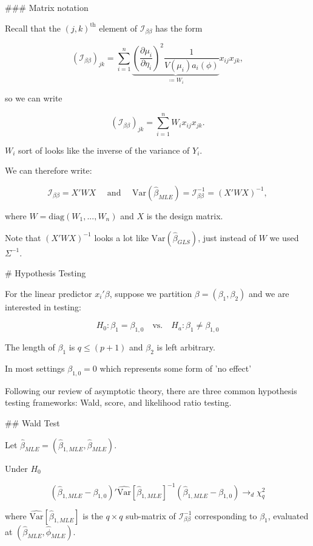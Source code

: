 \documentclass[
  letterpaper,
  DIV=11,
  numbers=noendperiod]{scrreport}
\begin{document}
{### Matrix notation 

Recall that the $(j,k)^{\text{th}}$ element of $\mathcal I_{\beta \beta}$ has the form 

$$(\mathcal I_{\beta \beta})_{jk} = \sum_{i=1}^n \underbrace{\left( \frac{\partial \mu_i}{\partial \eta_i} \right)^2 \frac{1}{V(\mu_i) a_i(\phi)}}_{\coloneqq W_i} x_{ij}x_{jk},$$

so we can write 

$$(\mathcal I_{\beta \beta})_{jk} = \sum_{i=1}^n W_i x_{ij}x_{jk}.$$

$W_i$ sort of looks like the inverse of the variance of $Y_i$. 

We can therefore write: 

$$\mathcal I_{\beta \beta} = X'WX \quad \text{ and } \quad \text{Var}(\hat \beta_{MLE}) = \mathcal I_{\beta \beta}^{-1} = (X'WX)^{-1},$$

where $W = \text{diag}(W_1, ..., W_n)$ and $X$ is the design matrix.

Note that $(X'WX)^{-1}$ looks a lot  like $\text{Var}(\hat \beta_{GLS})$, just instead
of $W$ we used $\Sigma^{-1}$. 

# Hypothesis Testing

For the linear predictor $x_i' \beta$, suppose we partition $\beta = (\beta_1, \beta_2)$ and we are interested in testing: 

$$H_0 : \beta_1 = \beta_{1,0} \quad \text{vs.} \quad H_a : \beta_1 \neq \beta_{1,0}$$

The length of $\beta_1$ is $q \leq (p+1)$ and $\beta_2$ is left arbitrary. 

In most settings $\beta_{1,0} = 0$ which represents some form of 'no effect' 

Following our review of asymptotic theory, there are three common hypothesis testing 
frameworks: Wald, score, and likelihood ratio testing.

## Wald Test

Let $\hat \beta_{MLE} = (\hat \beta_{1,MLE}, \hat \beta_{MLE})$. 

Under $H_0$

$$(\hat \beta_{1,MLE} - \beta_{1,0})' \widehat{\text{Var}}[\hat \beta_{1,MLE}]^{-1}(\hat\beta_{1,MLE} - \beta_{1,0}) \longrightarrow_d \chi^2_q$$

where $\widehat{\text{Var}}[\hat \beta_{1,MLE}]$ is the $q\times q$ sub-matrix of 
$\mathcal{I}_{\beta\beta}^{-1}$ corresponding to $\beta_1$, evaluated at 
$\left( \hat \beta_{MLE}, \hat \phi_{MLE} \right).$

}
\end{document}
